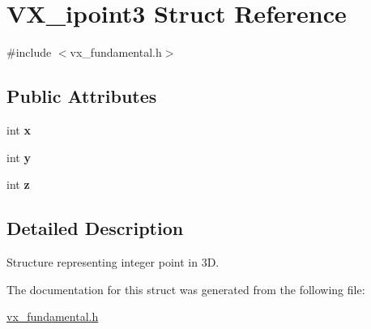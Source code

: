 \hypertarget{structVX__ipoint3}{\section{V\-X\-\_\-ipoint3 Struct Reference}
\label{structVX__ipoint3}
}


{\ttfamily \#include $<$vx\-\_\-fundamental.\-h$>$}

\subsection*{Public Attributes}
\begin{DoxyCompactItemize}
\item 
\hypertarget{structVX__ipoint3_ac2cf3eb1f11a262c5c8af10f42f7244c}{int {\bfseries x}}\label{structVX__ipoint3_ac2cf3eb1f11a262c5c8af10f42f7244c}

\item 
\hypertarget{structVX__ipoint3_a46dcffa09b9a7bc44dc5148ea2682955}{int {\bfseries y}}\label{structVX__ipoint3_a46dcffa09b9a7bc44dc5148ea2682955}

\item 
\hypertarget{structVX__ipoint3_af82b114ae2c59c70053756cdc0a1a4fa}{int {\bfseries z}}\label{structVX__ipoint3_af82b114ae2c59c70053756cdc0a1a4fa}

\end{DoxyCompactItemize}


\subsection{Detailed Description}
Structure representing integer point in 3\-D. 

The documentation for this struct was generated from the following file\-:\begin{DoxyCompactItemize}
\item 
\hyperlink{vx__fundamental_8h}{vx\-\_\-fundamental.\-h}\end{DoxyCompactItemize}
